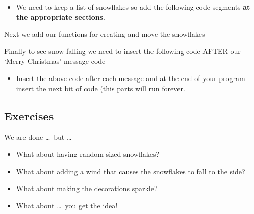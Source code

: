 \documentclass{coderdojo}
\newcommand\TODO[1]{
\begin{itemize}
\item[\todoSymbol] \color{todo} #1
\end{itemize}}
\begin{document}
\TODO{We need to keep a list of snowflakes so add the following code segments {\bf at the appropriate sections}.}


Next we add our functions for creating and move the snowflakes


Finally to see snow falling we need to insert the following code AFTER our `Merry Christmas' message code


\TODO{Insert the above code after each message and at the end of your program insert the next bit of code (this parts will run forever.}


\subsection{Exercises}

We are done \ldots\ but \ldots

\begin{itemize}
\item
What about having random sized snowflakes?
\item
What about adding a wind that causes the snowflakes to fall to the side?
\item
What about making the decorations sparkle?
\item
What about \ldots\ you get the idea!  
\end{itemize}
\end{document}

